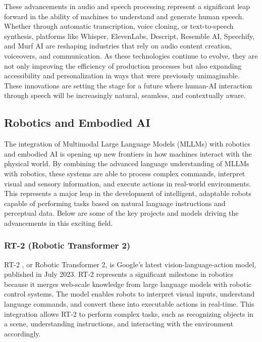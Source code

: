 These advancements in audio and speech processing represent a significant leap forward in the ability of machines to understand and generate human speech. 
Whether through automatic transcription, voice cloning, or text-to-speech synthesis, platforms like Whisper, ElevenLabs, Descript, Resemble AI, Speechify, and Murf AI are reshaping industries that rely on audio content creation, voiceovers, and communication. 
As these technologies continue to evolve, they are not only improving the efficiency of production processes but also expanding accessibility and personalization in ways that were previously unimaginable. 
These innovations are setting the stage for a future where human-AI interaction through speech will be increasingly natural, seamless, and contextually aware.

\subsection{Robotics and Embodied AI}

The integration of Multimodal Large Language Models (MLLMs) with robotics and embodied AI is opening up new frontiers in how machines interact with the physical world. 
By combining the advanced language understanding of MLLMs with robotics, these systems are able to process complex commands, interpret visual and sensory information, and execute actions in real-world environments. 
This represents a major leap in the development of intelligent, adaptable robots capable of performing tasks based on natural language instructions and perceptual data. 
Below are some of the key projects and models driving the advancements in this exciting field.

\subsubsection{RT-2 (Robotic Transformer 2)}

RT-2 \cite{brohan2023rt}, or Robotic Transformer 2, is Google's latest vision-language-action model, published in July 2023. 
RT-2 represents a significant milestone in robotics because it merges web-scale knowledge from large language models with robotic control systems. 
The model enables robots to interpret visual inputs, understand language commands, and convert these into executable actions in real-time. 
This integration allows RT-2 to perform complex tasks, such as recognizing objects in a scene, understanding instructions, and interacting with the environment accordingly.

